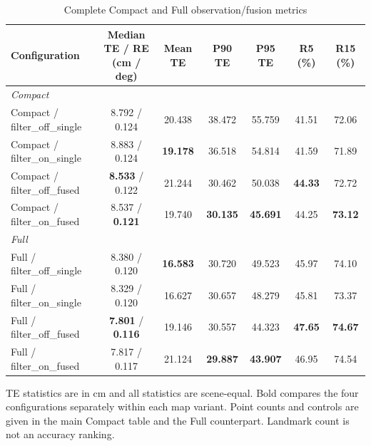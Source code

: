 \begin{table}[tp]
\centering
\footnotesize
\setlength{\tabcolsep}{4pt}
\renewcommand{\arraystretch}{1.12}
\caption{Complete Compact and Full observation/fusion metrics}
\label{tab:s_filter_fusion}
\begin{tabular}{lcccccc}
\toprule
Configuration & \shortstack{Median TE / RE\\(cm / deg)} & Mean TE & P90 TE & P95 TE & R5 (\%) & R15 (\%) \\
\midrule
\multicolumn{7}{l}{\textit{Compact}} \\
Compact / filter\_off\_single & 8.792 / 0.124 & 20.438 & 38.472 & 55.759 & 41.51 & 72.06 \\
Compact / filter\_on\_single & 8.883 / 0.124 & \textbf{19.178} & 36.518 & 54.814 & 41.59 & 71.89 \\
Compact / filter\_off\_fused & \textbf{8.533} / 0.122 & 21.244 & 30.462 & 50.038 & \textbf{44.33} & 72.72 \\
Compact / filter\_on\_fused & 8.537 / \textbf{0.121} & 19.740 & \textbf{30.135} & \textbf{45.691} & 44.25 & \textbf{73.12} \\
\midrule
\multicolumn{7}{l}{\textit{Full}} \\
Full / filter\_off\_single & 8.380 / 0.120 & \textbf{16.583} & 30.720 & 49.523 & 45.97 & 74.10 \\
Full / filter\_on\_single & 8.329 / 0.120 & 16.627 & 30.657 & 48.279 & 45.81 & 73.37 \\
Full / filter\_off\_fused & \textbf{7.801} / \textbf{0.116} & 19.146 & 30.557 & 44.323 & \textbf{47.65} & \textbf{74.67} \\
Full / filter\_on\_fused & 7.817 / 0.117 & 21.124 & \textbf{29.887} & \textbf{43.907} & 46.95 & 74.54 \\
\bottomrule
\end{tabular}
\par\smallskip\begin{minipage}{0.98\linewidth}\footnotesize TE statistics are in cm and all statistics are scene-equal. Bold compares the four configurations separately within each map variant. Point counts and controls are given in the main Compact table and the Full counterpart. Landmark count is not an accuracy ranking.\end{minipage}
\end{table}
